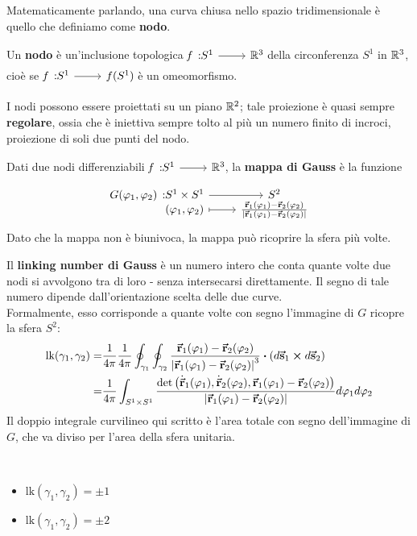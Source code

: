 Matematicamente parlando, una curva chiusa nello spazio tridimensionale è quello che definiamo come \textbf{nodo}.
\begin{define}[Nodo]
	Un \textbf{nodo} è un'inclusione topologica $\funz[f]{S^1}{\realset^3}$ della circonferenza $S^1$ in $\mathbb{R}^3$, cioè se $\funz[f]{S^1}{f(S^1)}$ è un omeomorfismo.
\end{define}
I nodi possono essere proiettati su un piano $\mathbb{R}^2$; tale proiezione è quasi sempre \textbf{regolare}, ossia che è iniettiva sempre tolto al più un numero finito di incroci, proiezione di soli due punti del nodo.
\begin{define}
	Dati due nodi differenziabili $\funz[f]{S^1}{\realset^3}$, la \textbf{mappa di Gauss} è la funzione
	\begin{equation}
		\funztot[G(\phi_1,\phi_2)]{S^1\times S^1}{S^2}{\left(\phi_1,\phi_2\right)}{\frac{\vba{r}_1(\phi_1) - \vba{r}_2 (\phi_2)}{\abs{\vba{r}_1(\phi_1) - \vba{r}_2(\phi_2)}}}
	\end{equation}
	Dato che la mappa non è biunivoca, la mappa può ricoprire la sfera più volte.
\end{define}
\begin{define}
	Il \textbf{linking number di Gauss} è un numero intero che conta quante volte due nodi si avvolgono tra di loro - senza intersecarsi direttamente. Il segno di tale numero dipende dall'orientazione scelta delle due curve.\\
	Formalmente, esso corrisponde a quante volte con segno l'immagine di $G$ ricopre la sfera $S^2$:
	\begin{align}
		\textrm{lk}(\gamma_1,\gamma_2)=&\frac{1}{4\pi}\frac{1}{4\pi}\oint_{\gamma_1} \oint_{\gamma_2} \frac{\vba{r}_1(\phi_1) - \vba{r}_2 (\phi_2)}{\abs{\vba{r}_1(\phi_1) - \vba{r}_2(\phi_2)}^3} \vdot \left(d\vba{s}_1\cross d\vba{s}_2\right)\\
		=&\frac{1}{4\pi}\int_{S^1\times S^1}\frac{\det\left(\vbd{r}_1(\phi_1),\vbd{r}_2(\phi_2),\vba{r}_1(\phi_1)-\vba{r}_2(\phi_2)\right)}{\abs{\vba{r}_1(\phi_1) - \vba{r}_2(\phi_2)}}d\phi_1d\phi_2
	\end{align}
	Il doppio integrale curvilineo qui scritto è l'area totale con segno dell'immagine di $G$, che va diviso per l'area della sfera unitaria.
\end{define}
\begin{example}~
	\begin{itemize}
		\item $\textrm{lk}(\gamma_1,\gamma_2)=\pm 1$ %
		\item $\textrm{lk}(\gamma_1,\gamma_2)=\pm 2$ %
	\end{itemize}
\end{example}
